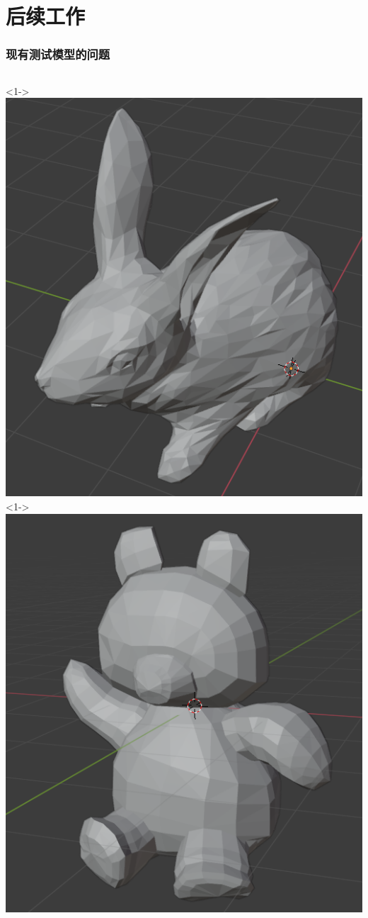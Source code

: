\documentclass[UTF8]{ctexbeamer}	%
\theoremstyle{plain}
\theoremstyle{definition}
\theoremstyle{remark}
\numberwithin{equation}{section}
\begin{document}
\section{后续工作}
\begin{frame}
    \frametitle{现有测试模型的问题}
    \begin{columns}
        <1->
        \includegraphics[width = \textwidth]{fig/wrong1.png}
        <1->
        \includegraphics[width = \textwidth]{fig/wrong2.png}

\end{columns}
\end{frame}
\end{document}
